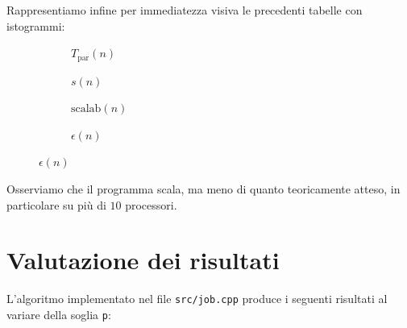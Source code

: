 \documentclass[12pt]{article}
\begin{document}
    Rappresentiamo infine per immediatezza visiva le precedenti tabelle con
    istogrammi:

    \begin{figure}[H]
      \centering
      \begin{subfigure}[b]{0.45\textwidth}
        \centering
        \resizebox{1.1\textwidth}{!}{}
        \caption*{\(T_{\text{par}}(n)\)}
      \end{subfigure}
      \hspace{0.05\textwidth}
      \begin{subfigure}[b]{0.45\textwidth}
        \centering
        \resizebox{1.1\textwidth}{!}{}
        \caption*{\(s(n)\)}
      \end{subfigure}

      \vspace{0.05\textwidth}

      \begin{subfigure}[b]{0.45\textwidth}
        \centering
        \resizebox{1.1\textwidth}{!}{}
        \caption*{\(\text{scalab}(n)\)}
      \end{subfigure}
      \hspace{0.05\textwidth}
      \begin{subfigure}[b]{0.45\textwidth}
        \centering
        \resizebox{1.1\textwidth}{!}{}
        \caption*{\(\epsilon(n)\)}
      \end{subfigure}
    \end{figure}

    Osserviamo che il programma scala, ma meno di quanto teoricamente atteso,
    in particolare su più di \(10\) processori.

    \section{Valutazione dei risultati}

    L'algoritmo implementato nel file \texttt{src/job.cpp} produce i
    seguenti risultati al variare della soglia \texttt{p}:
\end{document}
